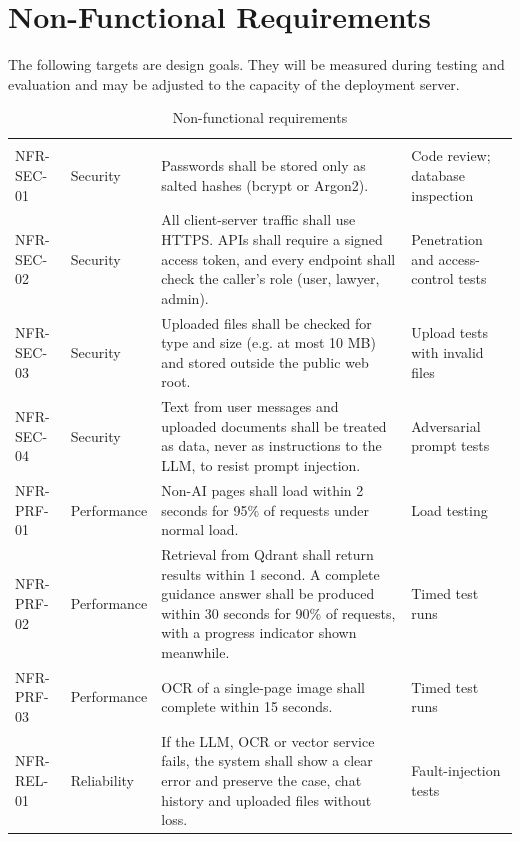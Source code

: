 \section{Non-Functional Requirements}

The following targets are design goals. They will be measured during testing and evaluation and may be adjusted to the capacity of the deployment server.

\begin{longtable}{|L{1.70cm}|L{1.70cm}|L{7.76cm}|L{2.85cm}|}
\caption{Non-functional requirements}\label{tab:3.4}\\
\hline\headrow {} &  &  &  \\ \hline
\endfirsthead
\hline\headrow {} &  &  &  \\ \hline
\endhead
\hline\endlastfoot
NFR-SEC-01 & Security & Passwords shall be stored only as salted hashes (bcrypt or Argon2). & Code review; database inspection \\ \hline
NFR-SEC-02 & Security & All client-server traffic shall use HTTPS. APIs shall require a signed access token, and every endpoint shall check the caller's role (user, lawyer, admin). & Penetration and access-control tests \\ \hline
NFR-SEC-03 & Security & Uploaded files shall be checked for type and size (e.g. at most 10 MB) and stored outside the public web root. & Upload tests with invalid files \\ \hline
NFR-SEC-04 & Security & Text from user messages and uploaded documents shall be treated as data, never as instructions to the LLM, to resist prompt injection. & Adversarial prompt tests \\ \hline
NFR-PRF-01 & Performance & Non-AI pages shall load within 2 seconds for 95\% of requests under normal load. & Load testing \\ \hline
NFR-PRF-02 & Performance & Retrieval from Qdrant shall return results within 1 second. A complete guidance answer shall be produced within 30 seconds for 90\% of requests, with a progress indicator shown meanwhile. & Timed test runs \\ \hline
NFR-PRF-03 & Performance & OCR of a single-page image shall complete within 15 seconds. & Timed test runs \\ \hline
NFR-REL-01 & Reliability & If the LLM, OCR or vector service fails, the system shall show a clear error and preserve the case, chat history and uploaded files without loss. & Fault-injection tests \\ \hline

\end{longtable}
